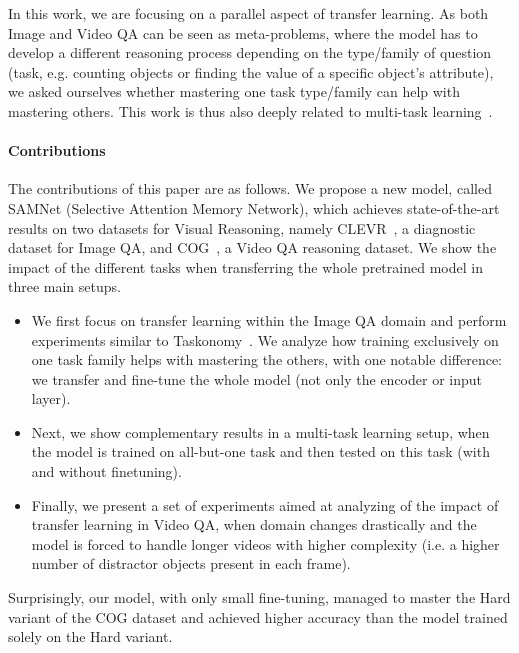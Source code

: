 In this work, we are focusing on a parallel aspect of transfer learning. As both Image and Video QA can be seen as meta-problems, where the model has to develop a different reasoning process depending on the type/family of question (task, e.g. counting objects or finding the value of a specific object's attribute), we asked ourselves whether mastering one task type/family can help with mastering others. This work is thus also deeply related to multi-task learning~\cite{caruana1997multitask}.

\paragraph{Contributions}

The contributions of this paper are as follows.
We propose a new model, called SAMNet (Selective Attention Memory Network), which achieves state-of-the-art results on two datasets for Visual Reasoning, namely CLEVR~\cite{johnson2017clevr}, a diagnostic dataset for Image QA, and COG~\cite{yang2018dataset}, a Video QA reasoning dataset.
We show the impact of the different tasks when transferring the whole pretrained model in three main setups.
\begin{itemize}
	\item We first focus on transfer learning within the Image QA domain and perform experiments similar to Taskonomy~\cite{zamir2018taskonomy}. We analyze how training exclusively on one task family helps with mastering the others, with one notable difference: we transfer and fine-tune the whole model (not only the encoder or input layer).
	\item Next, we show complementary results in a multi-task learning setup, when the model is trained on all-but-one task and then tested on this task (with and without finetuning).
	\item Finally, we present a set of experiments aimed at analyzing of the impact of transfer learning in Video QA, when domain changes drastically and the model is forced to handle longer videos with higher complexity (i.e. a higher number of distractor objects present in each frame).
\end{itemize}
Surprisingly, our model, with only small fine-tuning, managed to master the Hard variant of the COG dataset and achieved higher accuracy than the model trained solely on the Hard variant.


